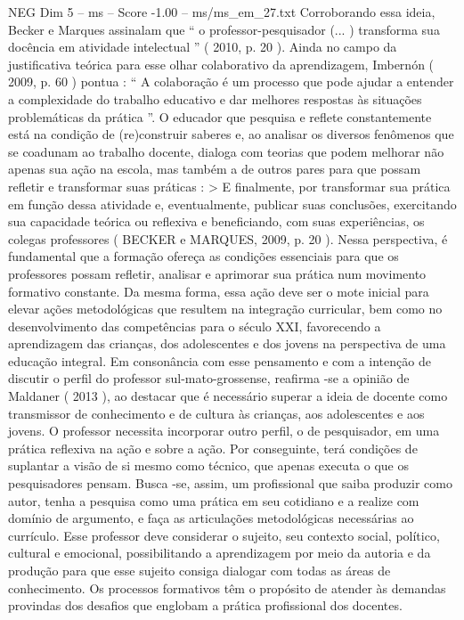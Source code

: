 \begin{textsample}{NEG Dim 5 – ms – Score -1.00 – ms/ms\_em\_27.txt}
Corroborando essa ideia, Becker e Marques assinalam que “ o professor-pesquisador (... ) transforma sua docência em atividade intelectual ” ( 2010, p. 20 ).
Ainda no campo da justificativa teórica para esse olhar colaborativo da aprendizagem, Imbernón ( 2009, p. 60 ) pontua : “ A colaboração é um processo que pode ajudar a entender a complexidade do trabalho educativo e dar melhores respostas às situações problemáticas da prática ”.
O educador que pesquisa e reflete constantemente está na condição de (re)construir saberes e, ao analisar os diversos fenômenos que se coadunam ao trabalho docente, dialoga com teorias que podem melhorar não apenas sua ação na escola, mas também a de outros pares para que possam refletir e transformar suas práticas : > E finalmente, por transformar sua prática em função dessa atividade e, eventualmente, publicar suas conclusões, exercitando sua capacidade teórica ou reflexiva e beneficiando, com suas experiências, os colegas professores ( BECKER e MARQUES, 2009, p. 20 ).
Nessa perspectiva, é fundamental que a formação ofereça as condições essenciais para que os professores possam refletir, analisar e aprimorar sua prática num movimento formativo constante.
Da mesma forma, essa ação deve ser o mote inicial para elevar ações metodológicas que resultem na integração curricular, bem como no desenvolvimento das competências para o século XXI, favorecendo a aprendizagem das crianças, dos adolescentes e dos jovens na perspectiva de uma educação integral.
Em consonância com esse pensamento e com a intenção de discutir o perfil do professor sul-mato-grossense, reafirma -se a opinião de Maldaner ( 2013 ), ao destacar que é necessário superar a ideia de docente como transmissor de conhecimento e de cultura às crianças, aos adolescentes e aos jovens.
O professor necessita incorporar outro perfil, o de pesquisador, em uma prática reflexiva na ação e sobre a ação.
Por conseguinte, terá condições de suplantar a visão de si mesmo como técnico, que apenas executa o que os pesquisadores pensam.
Busca -se, assim, um profissional que saiba produzir como autor, tenha a pesquisa como uma prática em seu cotidiano e a realize com domínio de argumento, e faça as articulações metodológicas necessárias ao currículo.
Esse professor deve considerar o sujeito, seu contexto social, político, cultural e emocional, possibilitando a aprendizagem por meio da autoria e da produção para que esse sujeito consiga dialogar com todas as áreas de conhecimento.
Os processos formativos têm o propósito de atender às demandas provindas dos desafios que englobam a prática profissional dos docentes.

\end{textsample}
